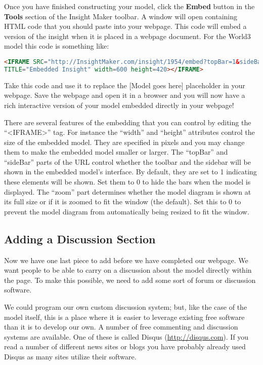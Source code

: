 \documentclass[]{memoir}
\renewcommand{\u}[1]{\textbf{#1}}
\begin{document}
Once you have finished constructing your model, click the \u{Embed}
button in the \u{Tools} section of the Insight Maker toolbar. A window
will open containing HTML code that you should paste into your webpage.
This code will embed a version of the insight when it is placed in a
webpage document. For the World3 model this code is something like:

\begin{lstlisting}[language=HTML]
<IFRAME SRC="http://InsightMaker.com/insight/1954/embed?topBar=1&sideBar=1&zoom=1"
TITLE="Embedded Insight" width=600 height=420></IFRAME>
\end{lstlisting}

Take this code and use it to replace the {[}Model goes here{]}
placeholder in your webpage. Save the webpage and open it in a browser
and you will now have a rich interactive version of your model embedded
directly in your webpage!

There are several features of the embedding that you can control by
editing the ``\textless{}IFRAME\textgreater{}'' tag. For instance the
``width'' and ``height'' attributes control the size of the embedded
model. They are specified in pixels and you may change them to make the
embedded model smaller or larger. The ``topBar'' and ``sideBar'' parts
of the URL control whether the toolbar and the sidebar will be shown in
the embedded model's interface. By default, they are set to 1 indicating
these elements will be shown. Set them to 0 to hide the bars when the
model is displayed. The ``zoom'' part determines whether the model
diagram is shown at its full size or if it is zoomed to fit the window
(the default). Set this to 0 to prevent the model diagram from
automatically being resized to fit the window.

\subsection{Adding a Discussion Section}

Now we have one last piece to add before we have completed our webpage.
We want people to be able to carry on a discussion about the model
directly within the page. To make this possible, we need to add some
sort of forum or discussion software.

We could program our own custom discussion system; but, like the case of
the model itself, this is a place where it is easier to leverage
existing free software than it is to develop our own. A number of free
commenting and discussion systems are available. One of these is called
Disqus (\url{http://disqus.com}). If you read a number of different news
sites or blogs you have probably already used Disqus as many sites
utilize their software.
\end{document}

